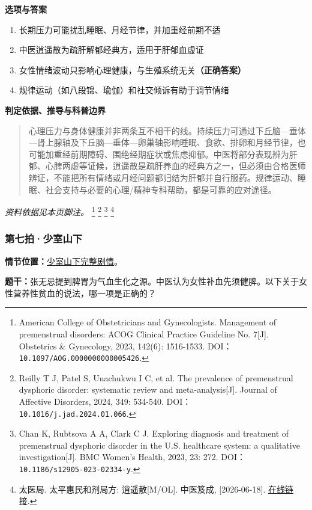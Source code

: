 \textbf{选项与答案}
\begin{enumerate}[label=\Alph*.,leftmargin=*]
  \item 长期压力可能扰乱睡眠、月经节律，并加重经前期不适
  \item 中医逍遥散为疏肝解郁经典方，适用于肝郁血虚证
  \item 女性情绪波动只影响心理健康，与生殖系统无关\textbf{（正确答案）}
  \item 规律运动（如八段锦、瑜伽）和社交倾诉有助于调节情绪
\end{enumerate}
\textbf{判定依据、推导与科普边界}
\begin{quote}心理压力与身体健康并非两条互不相干的线。持续压力可通过下丘脑—垂体—肾上腺轴及下丘脑—垂体—卵巢轴影响睡眠、食欲、排卵和月经节律，也可能加重经前期障碍、围绝经期症状或焦虑抑郁。中医将部分表现辨为肝郁、心脾两虚等证候，逍遥散是疏肝养血的经典方之一，但必须由合格医师辨证，不能把所有情绪或月经问题都归结为肝郁并自行服药。规律运动、睡眠、社会支持与必要的心理/精神专科帮助，都是可靠的应对途径。\end{quote}
\noindent\textit{资料依据见本页脚注。}
\footnote{American College of Obstetricians and Gynecologists. Management of premenstrual disorders: ACOG Clinical Practice Guideline No. 7[J]. Obstetrics \& Gynecology, 2023, 142(6): 1516-1533. DOI：\nolinkurl{10.1097/AOG.0000000000005426}.}
\footnote{Reilly T J, Patel S, Unachukwu I C, et al. The prevalence of premenstrual dysphoric disorder: systematic review and meta-analysis[J]. Journal of Affective Disorders, 2024, 349: 534-540. DOI：\nolinkurl{10.1016/j.jad.2024.01.066}.}
\footnote{Chan K, Rubtsova A A, Clark C J. Exploring diagnosis and treatment of premenstrual dysphoric disorder in the U.S. healthcare system: a qualitative investigation[J]. BMC Women's Health, 2023, 23: 272. DOI：\nolinkurl{10.1186/s12905-023-02334-y}.}
\footnote{太医局. 太平惠民和剂局方: 逍遥散[M/OL]. 中医笈成, [2026-06-18]. \href{https://jicheng.tw/tcm/book/太平惠民和剂局方_1/index.html}{在线链接}.}

\subsubsection{第七拍·少室山下}\label{question:zhaomin:7}
\textbf{情节位置：}\hyperref[plot:zhaomin:7]{少室山下完整剧情}。

\textbf{题干：}张无忌提到脾胃为气血生化之源。中医认为女性补血先须健脾。以下关于女性营养性贫血的说法，哪一项是正确的？

